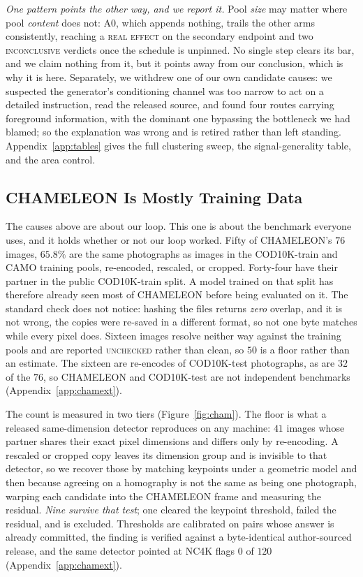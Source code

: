 \documentclass{article}
\newif\ifrevmarked \revmarkedtrue
\DeclareRobustCommand{\revC}[1]{\ifrevmarked{\color{RevC}#1}\else{#1}\fi}
\begin{document}
\textit{One pattern points the other way, and we report it.} Pool \emph{size} may matter where pool
\emph{content} does not: A0, which appends nothing, trails the other arms consistently, reaching a
\textsc{real effect} on the secondary endpoint and two \textsc{inconclusive} verdicts once the
schedule is unpinned. No single step clears its bar, and we claim nothing from it, but it points away
from our conclusion, which is why it is here. Separately, we withdrew one of our own candidate
causes: we suspected the generator's conditioning channel was too narrow to act on a detailed
instruction, read the released source, and found four routes carrying foreground information, with
the dominant one bypassing the bottleneck we had blamed; so the explanation was wrong and is
retired rather than left standing. Appendix~\ref{app:tables} gives the full clustering sweep, the
signal-generality table, and the area control.

\subsection{CHAMELEON Is Mostly Training Data}
\label{sec:contamination}
The causes above are about our loop. This one is about the benchmark everyone uses, and it holds
whether or not our loop worked. Fifty of CHAMELEON's $76$ images, $65.8\%$ are the same photographs as images in the
COD10K-train and CAMO training pools, re-encoded, rescaled, or cropped. Forty-four have their
partner in the public COD10K-train split. A model trained on that split has therefore already seen
most of CHAMELEON before being evaluated on it. The standard check does not notice: hashing the
files returns \emph{zero} overlap, and it is not wrong, the copies were re-saved in a different
format, so not one byte matches while every pixel does. Sixteen images resolve neither way \revC{against the training pools} and are
reported \textsc{unchecked} rather than clean, so $50$ is a floor rather than an estimate\revC{. The sixteen are re-encodes
of COD10K-test photographs, as are $32$ of the $76$, so CHAMELEON and COD10K-test are not independent benchmarks
(Appendix~\ref{app:chamext})}.

The count is measured in two tiers (Figure~\ref{fig:cham}). The floor is what a released
same-dimension detector reproduces on any machine: $41$ images whose partner shares their exact
pixel dimensions and differs only by re-encoding. A rescaled or cropped copy leaves its dimension
group and is invisible to that detector, so we recover those by matching keypoints under a geometric
model and then because agreeing on a homography is not the same as being one photograph, warping each candidate into the CHAMELEON frame and measuring the residual. \textit{Nine survive that test}; one cleared the keypoint threshold, failed the residual, and is excluded. Thresholds are calibrated on pairs whose answer is already committed, the finding is verified against a
byte-identical author-sourced release, and the same detector pointed at NC4K flags $0$ of $120$ (Appendix~\ref{app:chamext}).
\end{document}
